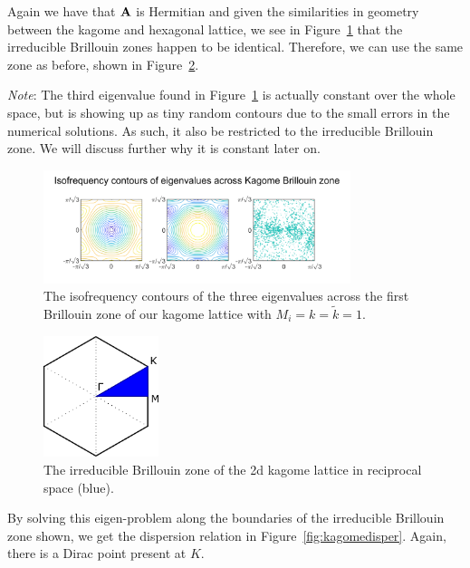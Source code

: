 Again we have that $\mathbf{A}$ is Hermitian and given the similarities in
geometry between the kagome and hexagonal lattice, we see in
Figure~\ref{fig:kagomeisofreq} that the irreducible Brillouin zones happen to
be identical. Therefore, we can use the same zone as before, shown in
Figure~\ref{fig:ibzonekagome}.

\textit{Note}: The third eigenvalue found in Figure~\ref{fig:kagomeisofreq} is
actually constant over the whole space, but is showing up as tiny random
contours due to the small errors in the numerical solutions. As such, it also
be restricted to the irreducible Brillouin zone. We will discuss further why it
is constant later on.

\begin{figure}[!h]
\centering
\includegraphics[width=0.8\textwidth]{imgs/kagomeisofreq.png}
\caption{\label{fig:kagomeisofreq} The isofrequency contours of the three
  eigenvalues across the first Brillouin zone of our kagome lattice with
  $M_i=k=\tilde{k}=1$.}
\end{figure}

\begin{figure}[!h]
\centering
\includegraphics[width=0.3\textwidth]{imgs/kagomeibz.png}
\caption{\label{fig:ibzonekagome} The irreducible Brillouin zone of the 2d
    kagome lattice in reciprocal space (blue).}
\end{figure}

By solving this eigen-problem along the boundaries of the irreducible Brillouin
zone shown, we get the dispersion relation in Figure~\ref{fig:kagomedisper}.
Again, there is a Dirac point present at $K$.

